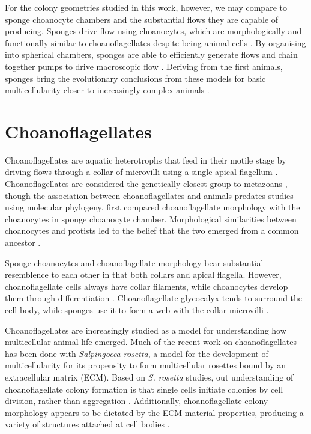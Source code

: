 For the colony geometries studied in this work, however, we may compare to sponge choanocyte chambers and the substantial flows they are capable of producing. 
Sponges drive flow using choanocytes, which are morphologically and functionally similar to choanoflagellates despite being animal cells \citep{larsen1994,carr2008}.
By organising into spherical chambers, sponges are able to efficiently generate flows and chain together pumps to drive macroscopic flow \citep{asadzadeh2019}.
Deriving from the first animals, sponges bring the evolutionary conclusions from these models for basic multicellularity closer to increasingly complex animals \citep{nielsen2008}.

\section{Choanoflagellates} \label{sec:choano} %

Choanoflagellates are aquatic heterotrophs that feed in their motile stage by driving flows through a collar of microvilli using a single apical flagellum \citep{karpov1998}.
Choanoflagellates are considered the genetically closest group to metazoans \citep{carr2008}, though the association between choanoflagellates and animals predates studies using molecular phylogeny.
\citet{james1871} first compared choanoflagellate morphology with the choanocytes in sponge choanocyte chamber. 
Morphological similarities between choanocytes and protists led to the belief that the two emerged from a common ancestor \citep{saedeleer1930,tuzet1963}.

Sponge choanocytes and choanoflagellate morphology bear substantial resemblence to each other in that both collars and apical flagella.
However, choanoflagellate cells always have collar filaments, while choanocytes develop them through differentiation \citep{mah2014}.
Choanoflagellate glycocalyx tends to surround the cell body, while sponges use it to form a web with the collar microvilli \citep{leadbeater2008}.

Choanoflagellates are increasingly studied as a model for understanding how multicellular animal life emerged. 
Much of the recent work on choanoflagellates has been done with \textit{Salpingoeca rosetta}, a model for the development of multicellularity for its propensity to form multicellular rosettes bound by an extracellular matrix (ECM).
Based on \textit{S. rosetta} studies, out understanding of choanoflagellate colony formation is that single cells initiate colonies by cell division, rather than aggregation \citep{fairclough2010}.
Additionally, choanoflagellate colony morphology appears to be dictated by the ECM material properties, producing a variety of structures attached at cell bodies \citep{larson2020}.

